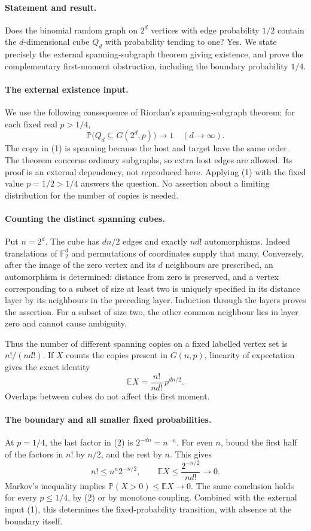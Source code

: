 \paragraph{Statement and result.}
Does the binomial random graph on \(2^d\) vertices with edge probability \(1/2\) contain the \(d\)-dimensional cube \(Q_d\) with probability tending to one? Yes. We state precisely the external spanning-subgraph theorem giving existence, and prove the complementary first-moment obstruction, including the boundary probability \(1/4\).

\paragraph{The external existence input.}
We use the following consequence of Riordan's spanning-subgraph theorem: for each fixed real \(p>1/4\),
\[
 \mathbb P\bigl(Q_d\subseteq G(2^d,p)\bigr)\longrightarrow1
 \quad(d\longrightarrow\infty). \tag{1}
\]
The copy in (1) is spanning because the host and target have the same order. The theorem concerns ordinary subgraphs, so extra host edges are allowed. Its proof is an external dependency, not reproduced here. Applying (1) with the fixed value \(p=1/2>1/4\) answers the question. No assertion about a limiting distribution for the number of copies is needed.

\paragraph{Counting the distinct spanning cubes.}
Put \(n=2^d\). The cube has \(dn/2\) edges and exactly \(n d!\) automorphisms. Indeed translations of \(\mathbb F_2^d\) and permutations of coordinates supply that many. Conversely, after the image of the zero vertex and its \(d\) neighbours are prescribed, an automorphism is determined: distance from zero is preserved, and a vertex corresponding to a subset of size at least two is uniquely specified in its distance layer by its neighbours in the preceding layer. Induction through the layers proves the assertion. For a subset of size two, the other common neighbour lies in layer zero and cannot cause ambiguity.

Thus the number of different spanning copies on a fixed labelled vertex set is \(n!/(n d!)\). If \(X\) counts the copies present in \(G(n,p)\), linearity of expectation gives the exact identity
\[
 \mathbb E X=\frac{n!}{n d!}\,p^{dn/2}. \tag{2}
\]
Overlaps between cubes do not affect this first moment.

\paragraph{The boundary and all smaller fixed probabilities.}
At \(p=1/4\), the last factor in (2) is \(2^{-dn}=n^{-n}\). For even \(n\), bound the first half of the factors in \(n!\) by \(n/2\), and the rest by \(n\). This gives
\[
 n!\leq n^n2^{-n/2},\qquad
 \mathbb E X\leq\frac{2^{-n/2}}{n d!}\longrightarrow0.
\]
Markov's inequality implies \(\mathbb P(X>0)\leq\mathbb E X\to0\). The same conclusion holds for every \(p\leq1/4\), by (2) or by monotone coupling. Combined with the external input (1), this determines the fixed-probability transition, with absence at the boundary itself.

